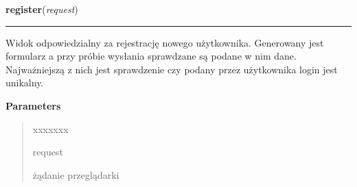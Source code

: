     \label{ass8_portal:accounts:views:register}

    \vspace{0.5ex}

\hspace{.8\funcindent}\begin{boxedminipage}{\funcwidth}

    \raggedright \textbf{register}(\textit{request})

    \vspace{-1.5ex}

    \rule{\textwidth}{0.5\fboxrule}
\setlength{\parskip}{2ex}
    Widok odpowiedzialny za rejestrację nowego użytkownika. Generowany jest
    formularz a przy próbie wysłania sprawdzane są podane w nim dane. 
    Najważniejszą z nich jest sprawdzenie czy podany przez użytkownika 
    login jest unikalny.

\setlength{\parskip}{1ex}
      \textbf{Parameters}
      \vspace{-1ex}

      \begin{quote}
        \begin{Ventry}{xxxxxxx}

          \item[request]

          żądanie przeglądarki

        \end{Ventry}

      \end{quote}

    \end{boxedminipage}

    \label{ass8_portal:accounts:views:profile_view}

    \vspace{0.5ex}

